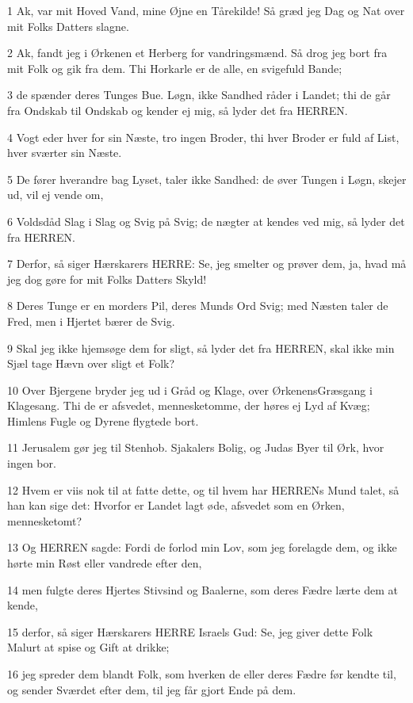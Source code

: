 \par 1 Ak, var mit Hoved Vand, mine Øjne en Tårekilde! Så græd jeg Dag og Nat over mit Folks Datters slagne.
\par 2 Ak, fandt jeg i Ørkenen et Herberg for vandringsmænd. Så drog jeg bort fra mit Folk og gik fra dem. Thi Horkarle er de alle, en svigefuld Bande;
\par 3 de spænder deres Tunges Bue. Løgn, ikke Sandhed råder i Landet; thi de går fra Ondskab til Ondskab og kender ej mig, så lyder det fra HERREN.
\par 4 Vogt eder hver for sin Næste, tro ingen Broder, thi hver Broder er fuld af List, hver sværter sin Næste.
\par 5 De fører hverandre bag Lyset, taler ikke Sandhed: de øver Tungen i Løgn, skejer ud, vil ej vende om,
\par 6 Voldsdåd Slag i Slag og Svig på Svig; de nægter at kendes ved mig, så lyder det fra HERREN.
\par 7 Derfor, så siger Hærskarers HERRE: Se, jeg smelter og prøver dem, ja, hvad må jeg dog gøre for mit Folks Datters Skyld!
\par 8 Deres Tunge er en morders Pil, deres Munds Ord Svig; med Næsten taler de Fred, men i Hjertet bærer de Svig.
\par 9 Skal jeg ikke hjemsøge dem for sligt, så lyder det fra HERREN, skal ikke min Sjæl tage Hævn over sligt et Folk?
\par 10 Over Bjergene bryder jeg ud i Gråd og Klage, over ØrkenensGræsgang i Klagesang. Thi de er afsvedet, mennesketomme, der høres ej Lyd af Kvæg; Himlens Fugle og Dyrene flygtede bort.
\par 11 Jerusalem gør jeg til Stenhob. Sjakalers Bolig, og Judas Byer til Ørk, hvor ingen bor.
\par 12 Hvem er viis nok til at fatte dette, og til hvem har HERRENs Mund talet, så han kan sige det: Hvorfor er Landet lagt øde, afsvedet som en Ørken, mennesketomt?
\par 13 Og HERREN sagde: Fordi de forlod min Lov, som jeg forelagde dem, og ikke hørte min Røst eller vandrede efter den,
\par 14 men fulgte deres Hjertes Stivsind og Baalerne, som deres Fædre lærte dem at kende,
\par 15 derfor, så siger Hærskarers HERRE Israels Gud: Se, jeg giver dette Folk Malurt at spise og Gift at drikke;
\par 16 jeg spreder dem blandt Folk, som hverken de eller deres Fædre før kendte til, og sender Sværdet efter dem, til jeg får gjort Ende på dem.
